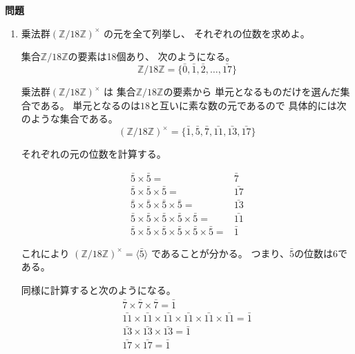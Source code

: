 \documentclass[12pt,b5paper]{ltjsarticle}
\begin{document}
\hrulefill
\textbf{問題}
\hrulefill

\begin{enumerate}
 \item
      乗法群$(\mathbb{Z}/18\mathbb{Z})^{\times}$
      の元を全て列挙し、
      それぞれの位数を求めよ。

      \dotfill
      
      集合$\mathbb{Z}/18\mathbb{Z}$の要素は18個あり、
      次のようになる。
      \begin{equation}
       \mathbb{Z}/18\mathbb{Z}
        =\{ \bar{0}, \bar{1}, \bar{2}, \dots , \bar{17} \}
      \end{equation}

      乗法群$(\mathbb{Z}/18\mathbb{Z})^{\times}$
      は
      集合$\mathbb{Z}/18\mathbb{Z}$の要素から
      単元となるものだけを選んだ集合である。
      単元となるのは$18$と互いに素な数の元であるので
      具体的には次のような集合である。
      \begin{equation}
       (\mathbb{Z}/18\mathbb{Z})^{\times}
        =
        \{ \bar{1},\bar{5},\bar{7},\bar{11},\bar{13},\bar{17} \}
      \end{equation}

      それぞれの元の位数を計算する。

      \begin{align}
       \bar{5} \times \bar{5} =& \bar{7}\\
       \bar{5} \times \bar{5} \times \bar{5} =& \bar{17}\\
       \bar{5} \times \bar{5} \times \bar{5} \times \bar{5} =& \bar{13}\\
       \bar{5} \times \bar{5} \times \bar{5} \times \bar{5} \times \bar{5}=& \bar{11}\\
       \bar{5} \times \bar{5} \times \bar{5} \times \bar{5} \times \bar{5}\times \bar{5}=& \bar{1}
      \end{align}

      これにより
      $(\mathbb{Z}/18\mathbb{Z})^{\times} = \langle \bar{5} \rangle$
      であることが分かる。
      つまり、$\bar{5}$の位数は6である。

      同様に計算すると次のようになる。
      \begin{align}
       \bar{7}\times\bar{7}\times\bar{7}=\bar{1}\\
       \bar{11}\times\bar{11}\times\bar{11}\times\bar{11}\times\bar{11}\times\bar{11}=\bar{1}\\
       \bar{13}\times\bar{13}\times\bar{13}=\bar{1}\\
       \bar{17}\times\bar{17}=\bar{1}
      \end{align}


\end{enumerate}
\end{document}
